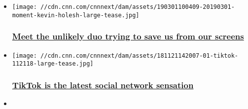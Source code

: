 \begin{itemize}
\item
  \href{/2019/03/01/tech/moment-app/index.html}{}

  \texttt{[image: //cdn.cnn.com/cnnnext/dam/assets/190301100409-20190301-moment-kevin-holesh-large-tease.jpg]}

  \hypertarget{meet-the-unlikely-duo-trying-to-save-us-from-our-screens}{%
  \subsubsection{\texorpdfstring{\href{/2019/03/01/tech/moment-app/index.html}{Meet
  the unlikely duo trying to save us from our
  screens}}{Meet the unlikely duo trying to save us from our screens}}\label{meet-the-unlikely-duo-trying-to-save-us-from-our-screens}}
\item
  \href{/2018/11/21/tech/tiktok-app/index.html}{}

  \texttt{[image: //cdn.cnn.com/cnnnext/dam/assets/181121142007-01-tiktok-112118-large-tease.jpg]}

  \hypertarget{tiktok-is-the-latest-social-network-sensation}{%
  \subsubsection{\texorpdfstring{\href{/2018/11/21/tech/tiktok-app/index.html}{TikTok
  is the latest social network
  sensation}}{TikTok is the latest social network sensation}}\label{tiktok-is-the-latest-social-network-sensation}}
\item
\end{itemize}

